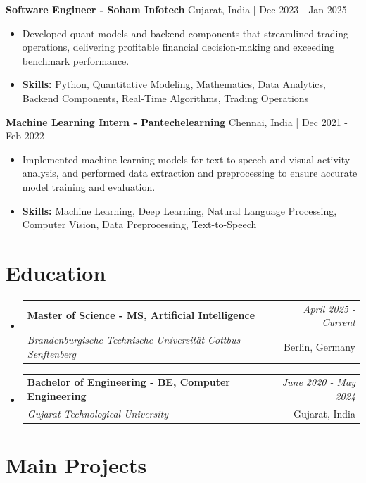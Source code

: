 \documentclass[a4paper,11pt]{article}
\makeatletter
\newcommand{\resumeSubheading}[4]{
\vspace{0.5mm}\item
    \begin{tabular*}{0.98\textwidth}[t]{l@{\extracolsep{\fill}}r}
        \textbf{#1} & \textit{\footnotesize{#4}} \\
        \textit{\footnotesize{#3}} &  \footnotesize{#2}\\
    \end{tabular*}
    \vspace{-2.4mm}
}
\makeatother
\begin{document}
\vspace{1mm}
  \textbf{Software Engineer - Soham Infotech} \hfill Gujarat, India | Dec 2023 - Jan 2025
\vspace{-1.5mm} %
\begin{itemize}
  \item Developed quant models and backend components that streamlined trading operations, delivering profitable financial decision-making and exceeding benchmark performance.

\vspace{-2mm}
  \item \textbf{Skills:} Python, Quantitative Modeling, Mathematics, Data Analytics, Backend Components, Real-Time Algorithms, Trading Operations
\end{itemize}

\vspace{1mm}
  \textbf{Machine Learning Intern - Pantechelearning} \hfill Chennai, India | Dec 2021 - Feb 2022
\vspace{-1.5mm} %
\begin{itemize}
  \item Implemented machine learning models for text-to-speech and visual-activity analysis, and performed data extraction and preprocessing to ensure accurate model training and evaluation.
\vspace{-2mm}
  \item \textbf{Skills:} Machine Learning, Deep Learning, Natural Language Processing, Computer Vision, Data Preprocessing, Text-to-Speech
\end{itemize}\section{\textbf{Education}}
\vspace{-0.4mm}

\begin{itemize}
\resumeSubheading
{Master of Science - MS, Artificial Intelligence }{Berlin, Germany}
{Brandenburgische Technische Universität Cottbus-Senftenberg  }{April 2025 - Current}

\vspace{1.0mm} %
\resumeSubheading
{Bachelor of Engineering - BE, Computer Engineering  }{Gujarat, India}
{Gujarat Technological University }{June 2020 - May 2024}

\end{itemize}
\section{\textbf{Main Projects}}
\end{document}
